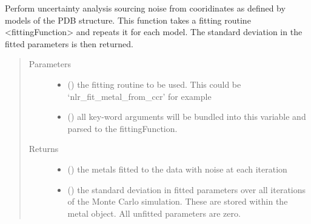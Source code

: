 \documentclass[a4paper,10pt,english,openany,oneside]{sphinxmanual}
\begin{document}
\begin{fulllineitems}
\label{\detokenize{reference/generated/paramagpy.fit.fit_error_models:paramagpy.fit.fit_error_models}}
Perform uncertainty analysis sourcing noise from cooridinates as defined
by models of the PDB structure.
This function takes a fitting routine \textless{}fittingFunction\textgreater{} and repeats it for
each model. The standard deviation in the fitted parameters is then returned.
\begin{quote}\begin{description}
\item[{Parameters}] \leavevmode\begin{itemize}
\item {} 
 () \textendash{} the fitting routine to be used.
This could be ‘nlr\_fit\_metal\_from\_ccr’ for example

\item {} 
 () \textendash{} all key-word arguments will be bundled into this variable and
parsed to the fittingFunction.

\end{itemize}

\item[{Returns}] \leavevmode
\begin{itemize}
\item {} 
 () \textendash{} the metals fitted to the data with noise at each iteration

\item {} 
 () \textendash{} the standard deviation in fitted parameters over all iterations of the
Monte Carlo simulation.
These are stored within the metal object. All unfitted parameters
are zero.

\end{itemize}


\end{description}\end{quote}

\end{fulllineitems}
\end{document}
